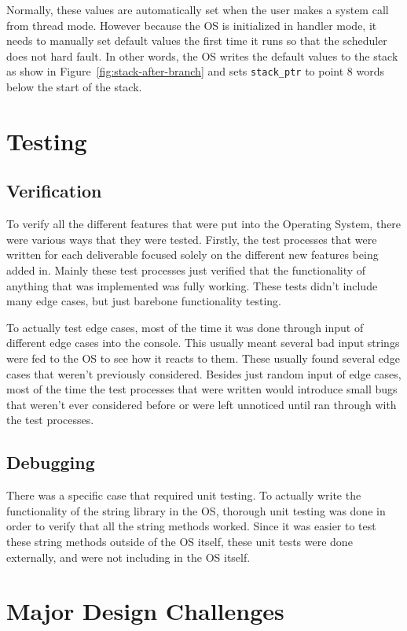 \documentclass[se]{uw-wkrpt}
\begin{document}
Normally, these values are automatically set when the user makes a system call from thread mode. However because the OS is initialized in handler mode, it needs to manually set default values the first time it runs so that the scheduler does not hard fault. In other words, the OS writes the default values to the stack as show in Figure~\ref{fig:stack-after-branch} and sets \texttt{stack\_ptr} to point 8 words below the start of the stack.

\section{Testing}\label{sec:test}

\subsection{Verification}
To verify all the different features that were put into the Operating System, there were various ways that they were tested. Firstly, the test processes that were written for each deliverable focused solely on the different new features being added in. Mainly these test processes just verified that the functionality of anything that was implemented was fully working. These tests didn't include many edge cases, but just barebone functionality testing. 

To actually test edge cases, most of the time it was done through input of different edge cases into the console. This usually meant several bad input strings were fed to the OS to see how it reacts to them. These usually found several edge cases that weren't previously considered. Besides just random input of edge cases, most of the time the test processes that were written would introduce small bugs that weren't ever considered before or were left unnoticed until ran through with the test processes. 
\subsection{Debugging}
 
There was a specific case that required unit testing. To actually write the functionality of the string library in the OS, thorough unit testing was done in order to verify that all the string methods worked. Since it was easier to test these string methods outside of the OS itself, these unit tests were done externally, and were not including in the OS itself.

\section{Major Design Challenges}\label{sec:design}
\end{document}
